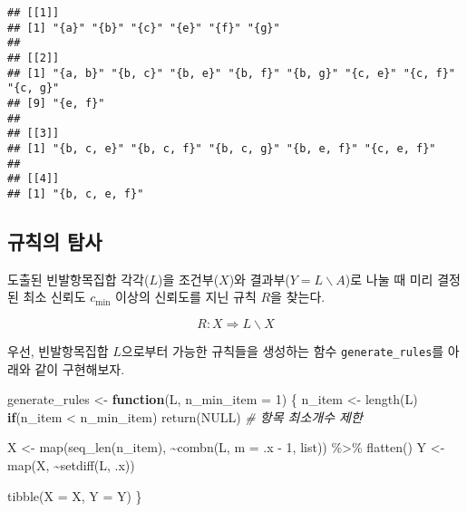 \documentclass[
]{book}
\newenvironment{Shaded}{\begin{snugshade}}{\end{snugshade}}
\newcommand{\AttributeTok}[1]{\textcolor[rgb]{0.77,0.63,0.00}{#1}}
\newcommand{\CommentTok}[1]{\textcolor[rgb]{0.56,0.35,0.01}{\textit{#1}}}
\newcommand{\ConstantTok}[1]{\textcolor[rgb]{0.00,0.00,0.00}{#1}}
\newcommand{\ControlFlowTok}[1]{\textcolor[rgb]{0.13,0.29,0.53}{\textbf{#1}}}
\newcommand{\DecValTok}[1]{\textcolor[rgb]{0.00,0.00,0.81}{#1}}
\newcommand{\FunctionTok}[1]{\textcolor[rgb]{0.00,0.00,0.00}{#1}}
\newcommand{\NormalTok}[1]{#1}
\newcommand{\OtherTok}[1]{\textcolor[rgb]{0.56,0.35,0.01}{#1}}
\newcommand{\SpecialCharTok}[1]{\textcolor[rgb]{0.00,0.00,0.00}{#1}}
\begin{document}
\begin{verbatim}
## [[1]]
## [1] "{a}" "{b}" "{c}" "{e}" "{f}" "{g}"
## 
## [[2]]
## [1] "{a, b}" "{b, c}" "{b, e}" "{b, f}" "{b, g}" "{c, e}" "{c, f}" "{c, g}"
## [9] "{e, f}"
## 
## [[3]]
## [1] "{b, c, e}" "{b, c, f}" "{b, c, g}" "{b, e, f}" "{c, e, f}"
## 
## [[4]]
## [1] "{b, c, e, f}"
\end{verbatim}

\hypertarget{apriori-rule-exploration}{%
\subsection{규칙의 탐사}\label{apriori-rule-exploration}}

도출된 빈발항목집합 각각(\(L\))을 조건부(\(X\))와 결과부(\(Y = L \backslash A\))로 나눌 때 미리 결정된 최소 신뢰도 \(c_{\text{min}}\) 이상의 신뢰도를 지닌 규칙 \(R\)을 찾는다.

\begin{equation*}
R: X \Rightarrow L \backslash X
\end{equation*}

우선, 빈발항목집합 \(L\)으로부터 가능한 규칙들을 생성하는 함수 \texttt{generate\_rules}를 아래와 같이 구현해보자.

\begin{Shaded}
\begin{Highlighting}[]
\NormalTok{generate\_rules }\OtherTok{\textless{}{-}} \ControlFlowTok{function}\NormalTok{(L, }\AttributeTok{n\_min\_item =} \DecValTok{1}\NormalTok{) \{}
\NormalTok{  n\_item }\OtherTok{\textless{}{-}} \FunctionTok{length}\NormalTok{(L)}
  \ControlFlowTok{if}\NormalTok{(n\_item }\SpecialCharTok{\textless{}}\NormalTok{ n\_min\_item) }\FunctionTok{return}\NormalTok{(}\ConstantTok{NULL}\NormalTok{) }\CommentTok{\# 항목 최소개수 제한}
  
\NormalTok{  X }\OtherTok{\textless{}{-}} \FunctionTok{map}\NormalTok{(}\FunctionTok{seq\_len}\NormalTok{(n\_item), }\SpecialCharTok{\textasciitilde{}}\FunctionTok{combn}\NormalTok{(L, }\AttributeTok{m =}\NormalTok{ .x }\SpecialCharTok{{-}} \DecValTok{1}\NormalTok{, list)) }\SpecialCharTok{\%\textgreater{}\%} \FunctionTok{flatten}\NormalTok{()}
\NormalTok{  Y }\OtherTok{\textless{}{-}} \FunctionTok{map}\NormalTok{(X, }\SpecialCharTok{\textasciitilde{}}\FunctionTok{setdiff}\NormalTok{(L, .x))}
  
  \FunctionTok{tibble}\NormalTok{(}\AttributeTok{X =}\NormalTok{ X, }\AttributeTok{Y =}\NormalTok{ Y)}
\NormalTok{\}}
\end{Highlighting}
\end{Shaded}
\end{document}
